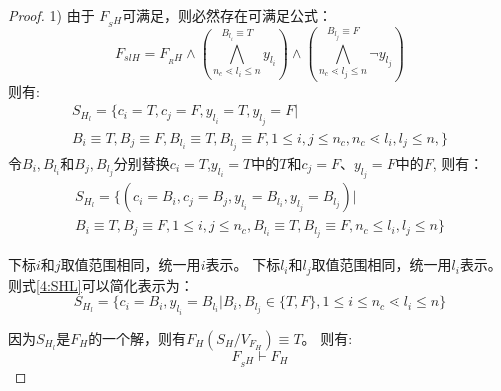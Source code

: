 \begin{proof}

1) 由于 $F_{_SH}$可满足，则必然存在可满足公式：
\begin{equation}
F_{slH}=F_{_RH}\wedge
(\bigwedge_{n_c\lessdot l_i\leqslant n}^{B_{l_i}\equiv T} y_{l_i})\wedge
(\bigwedge_{n_c\lessdot l_j\leqslant n}^{B_{l_j}\equiv F}\neg y_{l_j})
\end{equation}
则有:
\begin{multline}
S_{H_l}=\{c_{i}=T,c_{j}=F,y_{l_i}=T,y_{l_j}=F|
\\
B_i\equiv T, B_j\equiv F,
B_{l_i}\equiv T, B_{l_j}\equiv F,　
1\leqslant i,j\leqslant n_c,
n_c\lessdot l_i,l_j\leqslant n,
\}
\end{multline}
令$B_i,B_{l_i}$和$B_j,B_{l_j}$分别替换$c_{i}=T$,$y_{l_i}=T$中的$T$和$c_{j}=F$、$y_{l_j}=F$中的$F$, 则有：
\begin{multline}\label{4:SHL}
S_{H_l}=\{(c_i=B_i,c_j=B_j,y_{l_i}=B_{l_i},y_{l_j}=B_{l_j})|
\\
B_i\equiv T, B_j\equiv F, 1\leqslant i, j\leqslant n_c,
B_{l_i}\equiv T, B_{l_j}\equiv F, n_c\leqslant l_i, l_j\leqslant n
\}
\end{multline}

下标$i$和$j$取值范围相同，统一用$i$表示。
下标$l_i$和$l_j$取值范围相同，统一用$l_i$表示。
则式\ref{4:SHL}可以简化表示为：
\begin{equation}
S_{H_l}=\{c_i=B_i, y_{l_i}=B_{l_i}|B_i,B_{l_j} \in \{T,F\}, 1\leqslant i\leqslant n_c \lessdot l_i\leqslant n\}
\end{equation}

因为$S_{H_l}$是$F_H$的一个解，则有$F_H(S_H/V_{F_H})\equiv T$。 则有:
\begin{equation}\label{4:left}
 F_{_SH} \vdash F_H
\end{equation}


\end{proof}
